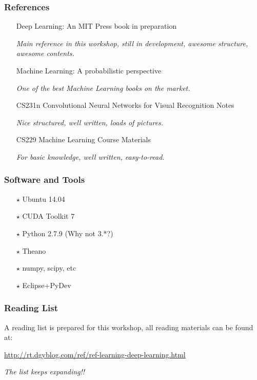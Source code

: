 \documentclass{beamer}
\begin{document}
\begin{frame}
  \frametitle{References}

  \begin{itemize}
    \item[\ding{169}] Deep Learning: An MIT Press book in preparation

      {\small \emph{Main reference in this workshop, still in development, awesome structure, awesome contents.}}

    \item[\ding{169}] Machine Learning: A probabilistic perspective

      {\small \emph{One of the best Machine Learning books on the market.}}
    \item[\ding{169}] CS231n Convolutional Neural Networks for Visual Recognition Notes

      {\small \emph{Nice structured, well written, loads of pictures.}}

    \item[\ding{169}] CS229 Machine Learning Course Materials

      {\small \emph{For basic knowledge, well written, easy-to-read.}}
  \end{itemize}
\end{frame}

\begin{frame}
    \frametitle{Software and Tools}
    
    \begin{itemize}
        \item[$\star$] Ubuntu 14.04
        \item[$\star$] CUDA Toolkit 7
        \item[$\star$] Python 2.7.9 (Why not 3.*?)
        \item[$\star$] Theano
        \item[$\star$] numpy, scipy, etc
        \item[$\star$] Eclipse+PyDev
    \end{itemize}
\end{frame}

\begin{frame}
  \frametitle{Reading List}

  A reading list is prepared for this workshop, all reading materials can be found at:

  \url{http://rt.dgyblog.com/ref/ref-learning-deep-learning.html}\vspace{1cm}

  \centering\emph{The list keeps expanding!!}
\end{frame}
\end{document}
